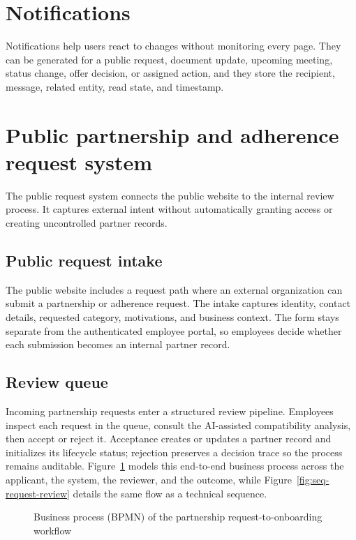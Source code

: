 \section{Notifications}

Notifications help users react to changes without monitoring every page. They can be generated for a public request, document update, upcoming meeting, status change, offer decision, or assigned action, and they store the recipient, message, related entity, read state, and timestamp.

\section{Public partnership and adherence request system}
The public request system connects the public website to the internal review process. It captures external intent without automatically granting access or creating uncontrolled partner records.

\subsection{Public request intake}
The public website includes a request path where an external organization can submit a partnership or adherence request. The intake captures identity, contact details, requested category, motivations, and business context. The form stays separate from the authenticated employee portal, so employees decide whether each submission becomes an internal partner record.

\subsection{Review queue}
Incoming partnership requests enter a structured review pipeline. Employees inspect each request in the queue, consult the AI-assisted compatibility analysis, then accept or reject it. Acceptance creates or updates a partner record and initializes its lifecycle status; rejection preserves a decision trace so the process remains auditable. Figure~\ref{fig:bpmn-onboarding} models this end-to-end business process across the applicant, the system, the reviewer, and the outcome, while Figure~\ref{fig:seq-request-review} details the same flow as a technical sequence.

\begin{figure}[htbp]
  \centering
  \caption{Business process (BPMN) of the partnership request-to-onboarding workflow}
  \label{fig:bpmn-onboarding}
\end{figure}

